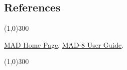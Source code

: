 




\subsection{References}

\line(1,0){300}

\href{http://cern.ch/mad}{MAD Home Page}, \href{http://cern.ch/mad8/user/mad.html}{MAD-8 User Guide}. 

\line(1,0){300}

